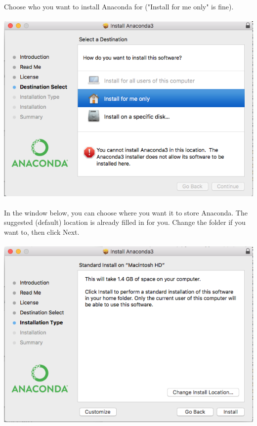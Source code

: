 \documentclass[]{article}
\begin{document}
\paragraph{}
Choose who you want to install Anaconda for ("Install for me only" is fine).
\paragraph{}
\begin{centering}
    \centerline{\includegraphics[scale=0.5]{Screenshot_7.png}}
\end{centering}

\clearpage
\paragraph{}
In the window below, you can choose where you want it to store Anaconda. The suggested (default) location is already filled in for you. Change the folder if you want to, then click Next.
\paragraph{}
\begin{centering}
    \centerline{\includegraphics[scale=0.5]{Screenshot_8.png}}
\end{centering}
\end{document}
